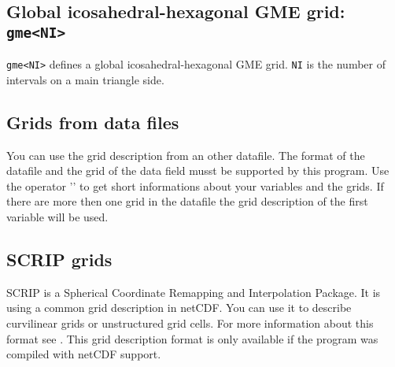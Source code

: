 
\subsection*{Global icosahedral-hexagonal GME grid: {\tt gme<NI>}}
    {\tt gme<NI>} defines a global icosahedral-hexagonal GME grid.
    {\tt NI} is the number of intervals on a main triangle side.

\subsection{Grids from data files}

You can use the grid description from an other datafile.
The format of the datafile and the grid of the data field musst
be supported by this program.
Use the operator '' to get short informations about
your variables and the grids.
If there are more then one grid in the datafile the grid description of
the first variable will be used.

\subsection{SCRIP grids}

SCRIP is a Spherical Coordinate Remapping and Interpolation Package.
It is using a common grid description in netCDF.
You can use it to describe curvilinear grids or unstructured grid cells.
For more information about this format see \cite{SCRIP}.
This grid description format is only available if the program was compiled
with netCDF support.

\vspace{2mm}

